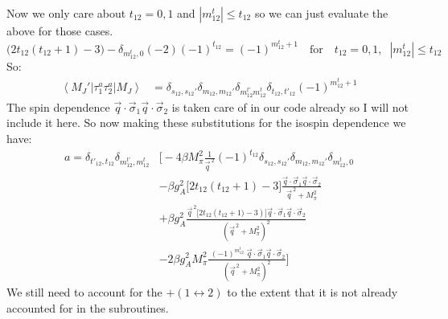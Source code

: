 \documentclass[11pt]{article}
\newcommand{\br}[1]{\left\langle #1 \right |}
\newcommand{\kt}[1]{\left| #1 \right \rangle}
\newcommand{\ot}{_{12}}
\newcommand{\tot}{t_{12}}
\newcommand{\totp}{t'_{12}}
\newcommand{\sq}{^{\,2}}
\begin{document}
Now we only care about $t_{12}=0,1$ and $|m^t\ot|\leq t\ot$ so we can just evaluate the above for those cases.
\begin{equation}
    \big( 2 t_{12} \left( \tot+1 \right) -3\big) - \delta_{m_{12}^t ,0} \left( -2 \right) (-1)^{t_{12}}= (-1)^{m\ot^t+1}\quad
    \text{for}\quad t_{12}=0,1,\;\;|m^t\ot|\leq t\ot
\end{equation}
So:
\begin{align}
    \br{M_J'}\tau_1^a \tau_2^a \kt{M_J}&= \delta_{s\ot,s\ot'}\delta_{m\ot,m\ot'}\delta_{m_{12}^{t'}{m_{12}^{t}}} \delta_{\tot,\totp} (-1)^{m^t\ot+1}
\end{align}
The spin dependence $\vec{q}\cdot \vec{\sigma}_1 \vec{q}\cdot \vec{\sigma}_2$ is taken care of in our code already so I will not include it here. So now making these substitutions for the isospin dependence we have:
\begin{align}
    a=\delta_{t'_{12},t_{12}} \delta_{m^{t'}\ot, m^t\ot}&\Bigg[ -4 \beta M_\pi^2 
        \frac{1}{\vec{q}\sq}(-1)^{t\ot}\delta_{s\ot,s\ot'}\delta_{m_{12},m\ot'}\delta_{m^t_{12},0}\nonumber\\
     &-\beta g_A^2 \Big[ 2 t\ot (t\ot+1)-3 \Big] \frac{\vec{q} \cdot \vec{\sigma}_{1} \vec{q} \cdot
     \vec{\sigma}_{2}}{\vec{q}\sq+M_\pi^2}\nonumber\\
          &+\beta g_A^2\frac{\vec{q}\sq \Big[2 t\ot \left( t\ot+1)-3 \right) \Big]\vec{q} \cdot \vec{\sigma}_{1} \vec{q}\cdot \vec{\sigma}_{2}}{\left(\vec{q}\sq+M_\pi^2\right)^2}\nonumber\\
          &-2\beta g_A^2 M_\pi^2\frac{\;(-1)^{m^t_{12}}\; \vec{q} \cdot \vec{\sigma}_{1} \vec{q}\cdot \vec{\sigma}_{2}}{\left(\vec{q}\sq+M_\pi^2\right)^2}\Bigg]
\end{align}
We still need to account for the $+(1\leftrightarrow2)$ to the extent that it is not already accounted for in the subroutines.
\end{document}
